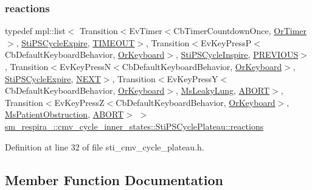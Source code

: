 \subsubsection{\texorpdfstring{reactions}{reactions}}
{\footnotesize\ttfamily typedef mpl\+::list$<$ Transition$<$Ev\+Timer$<$Cb\+Timer\+Countdown\+Once, \hyperlink{classsm__respira__1_1_1OrTimer}{Or\+Timer}$>$, \hyperlink{structsm__respira__1_1_1cmv__cycle__inner__states_1_1StiPSCycleExpire}{Sti\+P\+S\+Cycle\+Expire}, \hyperlink{structsm__respira__1_1_1cmv__cycle__inner__states_1_1StiPSCyclePlateau_1_1TIMEOUT}{T\+I\+M\+E\+O\+UT}$>$, Transition$<$Ev\+Key\+PressP$<$Cb\+Default\+Keyboard\+Behavior, \hyperlink{classsm__respira__1_1_1OrKeyboard}{Or\+Keyboard}$>$, \hyperlink{structsm__respira__1_1_1cmv__cycle__inner__states_1_1StiPSCycleInspire}{Sti\+P\+S\+Cycle\+Inspire}, \hyperlink{structsm__respira__1_1_1cmv__cycle__inner__states_1_1StiPSCyclePlateau_1_1PREVIOUS}{P\+R\+E\+V\+I\+O\+US}$>$, Transition$<$Ev\+Key\+PressN$<$Cb\+Default\+Keyboard\+Behavior, \hyperlink{classsm__respira__1_1_1OrKeyboard}{Or\+Keyboard}$>$, \hyperlink{structsm__respira__1_1_1cmv__cycle__inner__states_1_1StiPSCycleExpire}{Sti\+P\+S\+Cycle\+Expire}, \hyperlink{structsm__respira__1_1_1cmv__cycle__inner__states_1_1StiPSCyclePlateau_1_1NEXT}{N\+E\+XT}$>$, Transition$<$Ev\+Key\+PressY$<$Cb\+Default\+Keyboard\+Behavior, \hyperlink{classsm__respira__1_1_1OrKeyboard}{Or\+Keyboard}$>$, \hyperlink{classsm__respira__1_1_1MsLeakyLung}{Ms\+Leaky\+Lung}, \hyperlink{classABORT}{A\+B\+O\+RT}$>$, Transition$<$Ev\+Key\+PressZ$<$Cb\+Default\+Keyboard\+Behavior, \hyperlink{classsm__respira__1_1_1OrKeyboard}{Or\+Keyboard}$>$, \hyperlink{classsm__respira__1_1_1MsPatientObstruction}{Ms\+Patient\+Obstruction}, \hyperlink{classABORT}{A\+B\+O\+RT}$>$ $>$ \hyperlink{structsm__respira__1_1_1cmv__cycle__inner__states_1_1StiPSCyclePlateau_a01fe99a411c05403770fdc1005a9073a}{sm\+\_\+respira\+\_\+::cmv\+\_\+cycle\+\_\+inner\+\_\+states\+::\+Sti\+P\+S\+Cycle\+Plateau\+::reactions}}



Definition at line 32 of file sti\+\_\+cmv\+\_\+cycle\+\_\+plateau.\+h.



\subsection{Member Function Documentation}
\mbox{\label{structsm__respira__1_1_1cmv__cycle__inner__states_1_1StiPSCyclePlateau_a4d199f818afcfd88c0593aae82ad4583}} 
